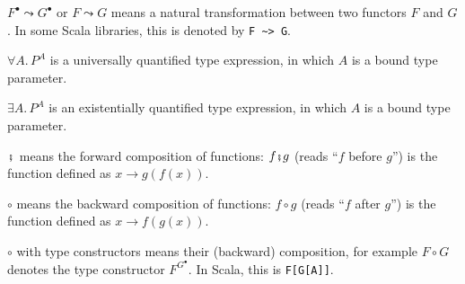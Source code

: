 $F^{\bullet}\leadsto G^{\bullet}$ or $F\leadsto G$ means a natural
transformation between two functors $F$ and $G$. In some Scala libraries,
this is denoted by \lstinline!F ~> G!.

$\forall A.\,P^{A}$ is a universally quantified type expression,
in which $A$ is a bound type parameter.

$\exists A.\,P^{A}$ is an existentially quantified type expression,
in which $A$ is a bound type parameter.

$\bef$ means the forward composition
of functions: $f\bef g$ (reads \textsf{``}$f$ before $g$\textsf{''}) is the function
defined as $x\rightarrow g(f(x))$.

$\circ$ means the backward composition
of functions: $f\circ g$ (reads \textsf{``}$f$ after $g$\textsf{''}) is the function
defined as $x\rightarrow f(g(x))$.

$\circ$ with type constructors means their (backward) composition,
for example $F\circ G$ denotes the type constructor $F^{G^{\bullet}}$.
In Scala, this is \lstinline!F[G[A]]!. 

